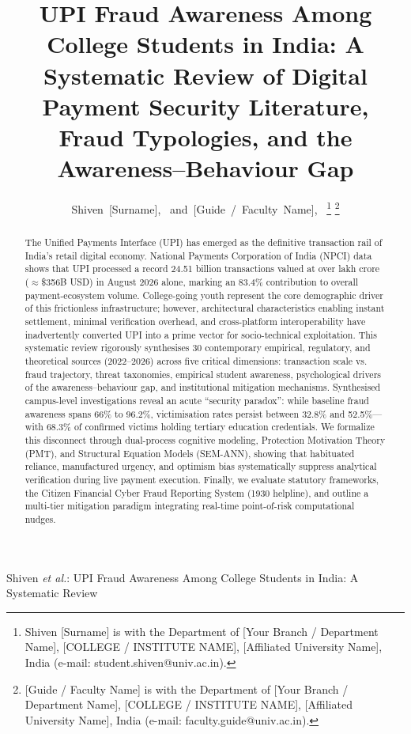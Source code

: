\documentclass[journal,10pt,twocolumn]{IEEEtran}
\begin{document}
\title{UPI Fraud Awareness Among College Students in India: A Systematic Review of Digital Payment Security Literature, Fraud Typologies, and the Awareness--Behaviour Gap}

\author{Shiven~[Surname],~
        and~[Guide~/~Faculty~Name],~%
\thanks{Shiven [Surname] is with the Department of [Your Branch / Department Name], [COLLEGE / INSTITUTE NAME], [Affiliated University Name], India (e-mail: student.shiven@univ.ac.in).}%
\thanks{[Guide / Faculty Name] is with the Department of [Your Branch / Department Name], [COLLEGE / INSTITUTE NAME], [Affiliated University Name], India (e-mail: faculty.guide@univ.ac.in).}}

%
{Shiven \MakeLowercase{\textit{et al.}}: UPI Fraud Awareness Among College Students in India: A Systematic Review}

\maketitle

\begin{abstract}
The Unified Payments Interface (UPI) has emerged as the definitive transaction rail of India's retail digital economy. National Payments Corporation of India (NPCI) data shows that UPI processed a record 24.51 billion transactions valued at over  lakh crore ($\approx$\$356B USD) in August 2026 alone, marking an 83.4\% contribution to overall payment-ecosystem volume. College-going youth represent the core demographic driver of this frictionless infrastructure; however, architectural characteristics enabling instant settlement, minimal verification overhead, and cross-platform interoperability have inadvertently converted UPI into a prime vector for socio-technical exploitation. This systematic review rigorously synthesises 30 contemporary empirical, regulatory, and theoretical sources (2022--2026) across five critical dimensions: transaction scale vs. fraud trajectory, threat taxonomies, empirical student awareness, psychological drivers of the awareness--behaviour gap, and institutional mitigation mechanisms. Synthesised campus-level investigations reveal an acute ``security paradox'': while baseline fraud awareness spans 66\% to 96.2\%, victimisation rates persist between 32.8\% and 52.5\%---with 68.3\% of confirmed victims holding tertiary education credentials. We formalize this disconnect through dual-process cognitive modeling, Protection Motivation Theory (PMT), and Structural Equation Models (SEM-ANN), showing that habituated reliance, manufactured urgency, and optimism bias systematically suppress analytical verification during live payment execution. Finally, we evaluate statutory frameworks, the Citizen Financial Cyber Fraud Reporting System (1930 helpline), and outline a multi-tier mitigation paradigm integrating real-time point-of-risk computational nudges.
\end{abstract}
\end{document}
